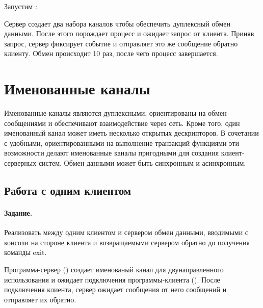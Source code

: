 

Запустим :





Сервер создает два набора каналов чтобы обеспечить дуплексный обмен данными. После этого порождает процесс  и ожидает запрос от клиента. Приняв запрос, сервер фиксирует событие и отправляет это же сообщение обратно клиенту. Обмен происходит 10 раз, после чего процесс завершается.

\section{Именованные каналы}

Именованные каналы являются дуплексными, ориентированы на обмен сообщениями и обеспечивают взаимодействие через сеть. Кроме того, один именованный канал может иметь несколько открытых дескрипторов. В сочетании с удобными, ориентированными на выполнение транзакций функциями эти возможности делают именованные каналы пригодными для создания клиент-серверных систем. Обмен данными может быть синхронным и асинхронным.

\subsection{Работа с одним клиентом}

\paragraph{Задание.} Реализовать между одним клиентом и сервером обмен данными, вводимыми с консоли на стороне клиента и возвращаемыми сервером обратно до получения команды exit.

Программа-сервер () создает именованый канал для двунаправленного использования и ожидает подключения программы-клиента (). После подключения клиента, сервер ожидает сообщения от него сообщений и отправляет их обратно.





